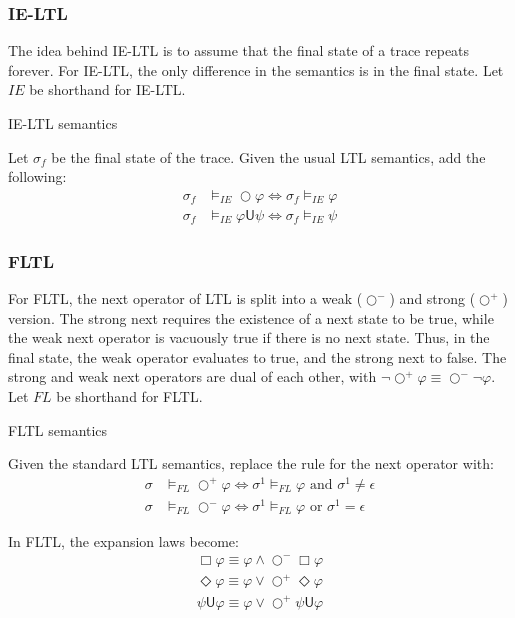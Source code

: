 \documentclass[a4paper]{article}
\newcommand{\U}{\mathsf{U}}
\newcommand{\tand}{\text{ and }}
\newcommand{\tor}{\text{ or }}
\newcommand{\sn}{\bigcirc^+}
\newcommand{\wn}{\bigcirc^-}
\begin{document}
\subsubsection{IE-LTL} The idea behind IE-LTL is to assume that the final state of a trace repeats forever. For IE-LTL, the only difference in the semantics is in the final state. Let $IE$ be shorthand for IE-LTL.
\begin{defn}{IE-LTL semantics}

  Let $\sigma_f$ be the final state of the trace. Given the usual LTL semantics, add the following:
  \begin{align*}
    \sigma_f &\vDash_{IE} \bigcirc \varphi \iff \sigma_f \vDash_{IE} \varphi\\
    \sigma_f &\vDash_{IE} \varphi \U \psi \iff \sigma_f \vDash_{IE} \psi
  \end{align*}
\end{defn}


\subsubsection{FLTL} For FLTL, the next operator of LTL is split into a weak ($\wn$) and strong ($\sn$) version.
The strong next requires the existence of a next state to be true, while the weak next operator is vacuously true if there is no next state.
Thus, in the final state, the weak operator evaluates to true, and the strong next to false. The strong and weak next operators are dual of each other, with  $\neg\sn\varphi \equiv \wn\neg\varphi$. Let $FL$ be shorthand for FLTL.
\begin{defn}{FLTL semantics}

  Given the standard LTL semantics, replace the rule for the next operator with:
  \begin{align*}
    \sigma&\vDash_{FL}\sn\varphi \iff \sigma^1\vDash_{FL}\varphi \tand \sigma^1 \neq \epsilon\\
    \sigma&\vDash_{FL}\wn\varphi \iff \sigma^1\vDash_{FL}\varphi \tor \sigma^1 = \epsilon
  \end{align*}
\end{defn}

\begin{lem}

  In FLTL, the expansion laws become:
  \begin{align}
    \Box \varphi \equiv \varphi \land \wn \Box \varphi \label{fltl-el1}\\
    \Diamond \varphi \equiv \varphi \lor \sn \Diamond \varphi\\
    \psi \U \varphi \equiv \varphi \lor \sn \psi \U \varphi
  \end{align}

\end{lem}
\end{document}
